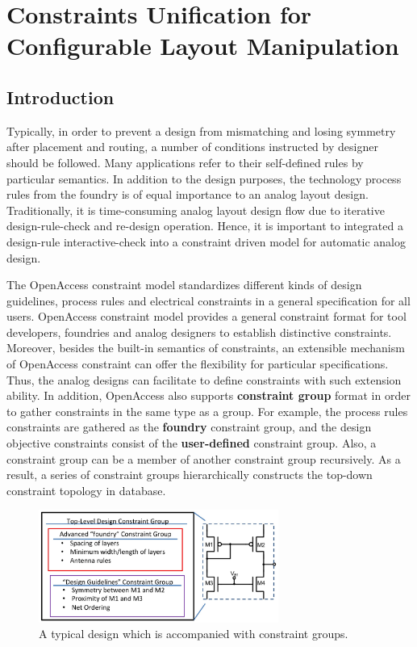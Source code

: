 
\chapter{Constraints Unification for Configurable Layout Manipulation}\label{chap:CUCLM}
  \section{Introduction}\label{sec:CUCLMIntro}

    Typically, in order to prevent a design from mismatching and losing symmetry after placement and routing, a number of conditions instructed by designer should be followed. Many applications refer to their self-defined rules by particular semantics. In addition to the design purposes, the technology process rules from the foundry is of equal importance to an analog layout design. Traditionally, it is time-consuming analog layout design flow due to iterative design-rule-check and re-design operation. Hence, it is important to integrated a design-rule interactive-check into a constraint driven model for automatic analog design. 

    The OpenAccess constraint model standardizes different kinds of design guidelines, process rules and electrical constraints in a general specification for all users. OpenAccess constraint model provides a general constraint format for tool developers, foundries and analog designers to establish distinctive constraints. Moreover, besides the built-in semantics of constraints, an extensible mechanism of OpenAccess constraint can offer the flexibility for particular specifications. Thus, the analog designs can facilitate to define constraints with such extension ability. In addition, OpenAccess also supports {\bf constraint group} format in order to gather constraints in the same type as a group. For example, the process rules constraints are gathered as the {\bf foundry} constraint group, and the design objective constraints consist of the {\bf user-defined} constraint group. Also, a constraint group can be a member of another constraint group recursively. As a result, a series of constraint groups hierarchically constructs the top-down constraint topology in database. 

    \begin{figure}[t]
      \centering
      \centerline{
        \includegraphics[width=0.7\textwidth]{Fig/Chapter3/CGSample0.eps}
      }
      \caption{A typical design which is accompanied with constraint groups.}
      \label{fig:CGGrouping}
    \end{figure}    
    
